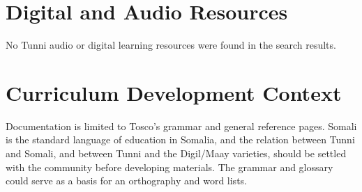 \documentclass[12pt]{article}
\begin{document}
\section{Digital and Audio Resources}
No Tunni audio or digital learning resources were found in the search results.

\section{Curriculum Development Context}
Documentation is limited to Tosco's grammar and general reference pages. Somali is the standard language of education in Somalia, and the relation between Tunni and Somali, and between Tunni and the Digil/Maay varieties, should be settled with the community before developing materials. The grammar and glossary could serve as a basis for an orthography and word lists.
\end{document}
